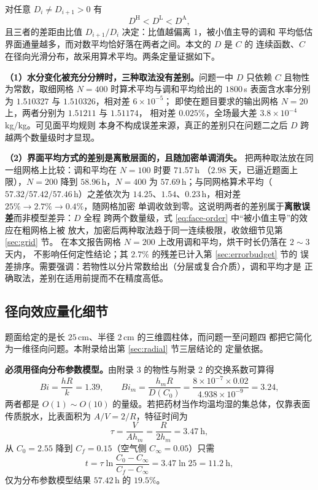 \documentclass[12pt,a4paper,fontset=none]{ctexart}
\begin{document}
对任意 $D_i\ne D_{i+1}>0$ 有
\begin{equation}
  D^{\mathrm H}<D^{\mathrm L}<D^{\mathrm A},
  \label{eq:face-order}
\end{equation}
且三者的差距由比值 $D_{i+1}/D_i$ 决定：比值越偏离 $1$，被小值主导的调和
平均低估界面通量越多，而对数平均恰好落在两者之间。本文的 $D$ 是 $C$ 的
连续函数、$C$ 在径向光滑分布，故采用算术平均。两条定量证据如下。

\textbf{（1）水分变化被充分分辨时，三种取法没有差别。}问题一中 $D$ 只依赖
$C$ 且物性为常数，取细网格 $N=400$ 时算术平均与调和平均给出的 $1800$\,s
表面含水率分别为 $1.510327$ 与 $1.510326$，相对差 $6\times10^{-5}$；
即使在题目要求的输出网格 $N=20$ 上，两者分别为 $1.51211$ 与 $1.51174$，
相对差 $0.025\%$，全场最大差 $3.8\times10^{-4}$\,kg/kg。可见面平均规则
本身不构成误差来源，真正的差别只在问题二之后 $D$ 跨越两个数量级时才显现。

\textbf{（2）界面平均方式的差别是离散层面的，且随加密单调消失。}
把两种取法放在同一组网格上比较：调和平均在 $N=100$ 时要 $71.57$\,h
（$2.98$ 天，已逼近题面上限），$N=200$ 降到 $58.96$\,h，$N=400$ 为
$57.69$\,h；与同网格算术平均（$57.32/57.42/57.46$\,h）之差依次为
$14.25$、$1.54$、$0.23$\,h，相对差 $25\%\to2.7\%\to0.4\%$，随网格加密
单调收敛到零。这说明两者的差别属于\textbf{离散误差}而非模型差异：$D$ 全程
跨两个数量级，式 \eqref{eq:face-order} 中“被小值主导”的效应在粗网格上被
放大，加密后两种取法趋于同一连续极限，收敛细节见第 \ref{sec:grid} 节。
在本文报告网格 $N=200$ 上改用调和平均，烘干时长仍落在 $2\sim3$ 天内，
不影响任何定性结论；其 $2.7\%$ 的残差已计入第 \ref{sec:errorbudget} 节的
误差排序。需要强调：若物性以分片常数给出（分层或复合介质），调和平均才是
正确取法，差别在适用前提而不在精度高低。

\subsection{径向效应量化细节}
\label{app:radial}

题面给定的是长 $25$\,cm、半径 $2$\,cm 的三维圆柱体，而问题一至问题四
都把它简化为一维径向问题。本附录给出第 \ref{sec:radial} 节三层结论的
定量依据。

\textbf{必须用径向分布参数模型。}由附录 3 的物性与附录 2 的交换系数可算得
\[
  Bi=\frac{hR}{k}=1.39,\qquad
  Bi_m=\frac{h_mR}{D(C_0)}
     =\frac{8\times10^{-7}\times0.02}{4.938\times10^{-9}}=3.24,
\]
两者都是 $O(1)\sim O(10)$ 的量级。若把药材当作均温均湿的集总体，仅靠表面
传质脱水，比表面积为 $A/V=2/R$，特征时间为
\[
  \tau=\frac{V}{Ah_m}=\frac{R}{2h_m}=3.47\ \text{h},
\]
从 $C_0=2.55$ 降到 $C_f=0.15$（空气侧 $C_\infty=0.05$）只需
\[
  t=\tau\ln\frac{C_0-C_\infty}{C_f-C_\infty}
   =3.47\ln 25=11.2\ \text{h},
\]
仅为分布参数模型结果 $57.42$\,h 的 $19.5\%$。
\end{document}
